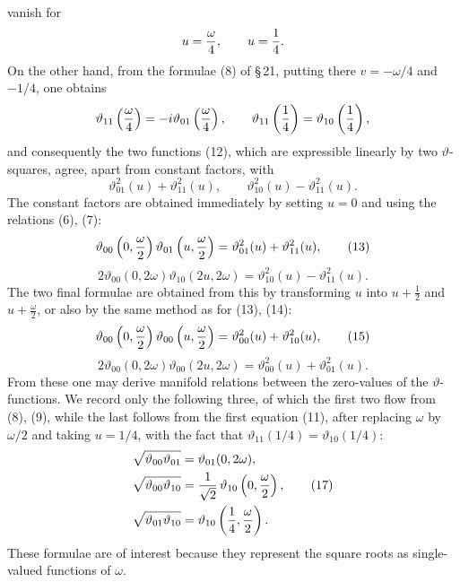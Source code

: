 \documentclass[11pt]{article}
\providecommand{\tht}{\vartheta}
\begin{document}
vanish for
\[
u={\omega\over4},\qquad u={1\over4}.
\]
On the other hand, from the formulae (8) of \S\,21, putting there $v=-\omega/4$ and $-1/4$, one obtains
\[
\tht_{11}\left({\omega\over4}\right)=-i\tht_{01}\left({\omega\over4}\right),
\qquad
\tht_{11}\left({1\over4}\right)=\tht_{10}\left({1\over4}\right),
\]
and consequently the two functions (12), which are expressible linearly by two $\vartheta$-squares, agree, apart from constant factors, with
\[
\tht_{01}^2(u)+\tht_{11}^2(u),\qquad \tht_{10}^2(u)-\tht_{11}^2(u).
\]
The constant factors are obtained immediately by setting $u=0$ and using the relations (6), (7):
\begin{equation}
\tht_{00}\left(0,{\omega\over2}\right)\tht_{01}\left(u,{\omega\over2}\right)
=\tht_{01}^2(u)+\tht_{11}^2(u), \tag{13}
\end{equation}
\begin{equation}
2\tht_{00}(0,2\omega)\tht_{10}(2u,2\omega)
=\tht_{10}^2(u)-\tht_{11}^2(u). \tag{14}
\end{equation}
The two final formulae are obtained from this by transforming $u$ into $u+\frac12$ and $u+\frac{\omega}{2}$, or also by the same method as for (13), (14):
\begin{equation}
\tht_{00}\left(0,{\omega\over2}\right)\tht_{00}\left(u,{\omega\over2}\right)
=\tht_{00}^2(u)+\tht_{10}^2(u), \tag{15}
\end{equation}
\begin{equation}
2\tht_{00}(0,2\omega)\tht_{00}(2u,2\omega)
=\tht_{00}^2(u)+\tht_{01}^2(u). \tag{16}
\end{equation}
From these one may derive manifold relations between the zero-values of the $\vartheta$-functions. We record only the following three, of which the first two flow from (8), (9), while the last follows from the first equation (11), after replacing $\omega$ by $\omega/2$ and taking $u=1/4$, with the fact that $\tht_{11}(1/4)=\tht_{10}(1/4)$:
\begin{align}
\sqrt{\tht_{00}\tht_{01}}&=\tht_{01}(0,2\omega),\notag\\
\sqrt{\tht_{00}\tht_{10}}&={1\over\sqrt2}\,\tht_{10}\left(0,{\omega\over2}\right), \tag{17}\\
\sqrt{\tht_{01}\tht_{10}}&=\tht_{10}\left({1\over4},{\omega\over2}\right).\notag
\end{align}
These formulae are of interest because they represent the square roots as single-valued functions of $\omega$.
\end{document}

